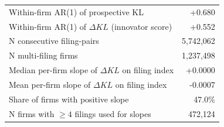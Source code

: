 \begin{tabular}{lr}
\toprule
Within-firm AR(1) of prospective KL & +0.680 \\
Within-firm AR(1) of $\Delta KL$ (innovator score) & +0.552 \\
\midrule
N consecutive filing-pairs & 5,742,062 \\
N multi-filing firms & 1,237,498 \\
\midrule
Median per-firm slope of $\Delta KL$ on filing index & +0.0000 \\
Mean per-firm slope of $\Delta KL$ on filing index & -0.0007 \\
Share of firms with positive slope & 47.0\% \\
N firms with $\geq 4$ filings used for slopes & 472,124 \\
\bottomrule
\end{tabular}
